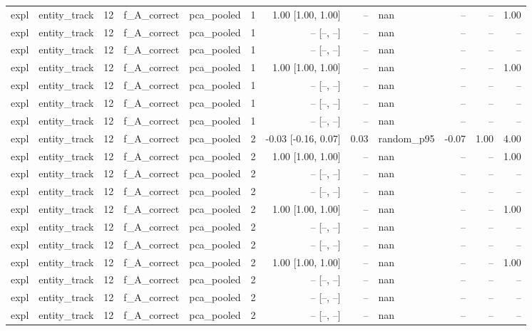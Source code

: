 \begin{tabular}{llrllrrrlrrr}
expl & entity\_track & 12 & f\_A\_correct & pca\_pooled & 1 & 1.00 [1.00, 1.00] & -- & nan & -- & -- & 1.00 \\
expl & entity\_track & 12 & f\_A\_correct & pca\_pooled & 1 & -- [--, --] & -- & nan & -- & -- & -- \\
expl & entity\_track & 12 & f\_A\_correct & pca\_pooled & 1 & -- [--, --] & -- & nan & -- & -- & -- \\
expl & entity\_track & 12 & f\_A\_correct & pca\_pooled & 1 & 1.00 [1.00, 1.00] & -- & nan & -- & -- & 1.00 \\
expl & entity\_track & 12 & f\_A\_correct & pca\_pooled & 1 & -- [--, --] & -- & nan & -- & -- & -- \\
expl & entity\_track & 12 & f\_A\_correct & pca\_pooled & 1 & -- [--, --] & -- & nan & -- & -- & -- \\
expl & entity\_track & 12 & f\_A\_correct & pca\_pooled & 1 & -- [--, --] & -- & nan & -- & -- & -- \\
expl & entity\_track & 12 & f\_A\_correct & pca\_pooled & 2 & -0.03 [-0.16, 0.07] & 0.03 & random\_p95 & -0.07 & 1.00 & 4.00 \\
expl & entity\_track & 12 & f\_A\_correct & pca\_pooled & 2 & 1.00 [1.00, 1.00] & -- & nan & -- & -- & 1.00 \\
expl & entity\_track & 12 & f\_A\_correct & pca\_pooled & 2 & -- [--, --] & -- & nan & -- & -- & -- \\
expl & entity\_track & 12 & f\_A\_correct & pca\_pooled & 2 & -- [--, --] & -- & nan & -- & -- & -- \\
expl & entity\_track & 12 & f\_A\_correct & pca\_pooled & 2 & 1.00 [1.00, 1.00] & -- & nan & -- & -- & 1.00 \\
expl & entity\_track & 12 & f\_A\_correct & pca\_pooled & 2 & -- [--, --] & -- & nan & -- & -- & -- \\
expl & entity\_track & 12 & f\_A\_correct & pca\_pooled & 2 & -- [--, --] & -- & nan & -- & -- & -- \\
expl & entity\_track & 12 & f\_A\_correct & pca\_pooled & 2 & 1.00 [1.00, 1.00] & -- & nan & -- & -- & 1.00 \\
expl & entity\_track & 12 & f\_A\_correct & pca\_pooled & 2 & -- [--, --] & -- & nan & -- & -- & -- \\
expl & entity\_track & 12 & f\_A\_correct & pca\_pooled & 2 & -- [--, --] & -- & nan & -- & -- & -- \\
expl & entity\_track & 12 & f\_A\_correct & pca\_pooled & 2 & -- [--, --] & -- & nan & -- & -- & -- \\

\end{tabular}
